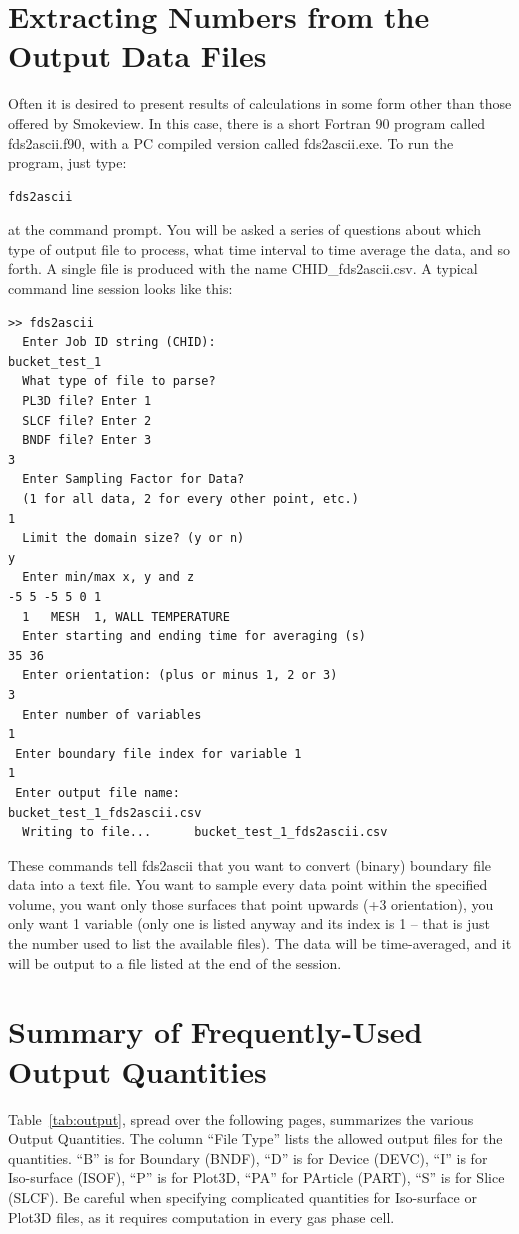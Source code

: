 \documentclass[11pt]{book}
\begin{document}
\section{Extracting Numbers from the Output Data Files}
\label{info:fds2ascii}

Often it is desired to present results of calculations in some form other than those offered by Smokeview. In this case, there is a short Fortran 90 program called {\ct fds2ascii.f90}, with a PC compiled version called {\ct fds2ascii.exe}. To run the program, just type:
\begin{lstlisting}
fds2ascii
\end{lstlisting}
at the command prompt. You will be asked a series of questions about which type of output file to process, what time interval to time average the data, and so forth. A single file is produced with the name {\ct CHID\_fds2ascii.csv}. A typical command line session looks like this:
\begin{lstlisting}
>> fds2ascii
  Enter Job ID string (CHID):
bucket_test_1
  What type of file to parse?
  PL3D file? Enter 1
  SLCF file? Enter 2
  BNDF file? Enter 3
3
  Enter Sampling Factor for Data?
  (1 for all data, 2 for every other point, etc.)
1
  Limit the domain size? (y or n)
y
  Enter min/max x, y and z
-5 5 -5 5 0 1
  1   MESH  1, WALL TEMPERATURE
  Enter starting and ending time for averaging (s)
35 36
  Enter orientation: (plus or minus 1, 2 or 3)
3
  Enter number of variables
1
 Enter boundary file index for variable 1
1
 Enter output file name:
bucket_test_1_fds2ascii.csv
  Writing to file...      bucket_test_1_fds2ascii.csv
\end{lstlisting}
These commands tell {\ct fds2ascii} that you want to convert (binary) boundary file data into a text file. You want to sample every data point within the specified volume, you want only those surfaces that point upwards (+3 orientation), you only want 1 variable (only one is listed anyway and its index is 1 -- that is just the number used to list the available files). The data will be time-averaged, and it will be output to a file listed at the end of the session.




\section{Summary of Frequently-Used Output Quantities}
\label{info:outputquantities}

Table~\ref{tab:output}, spread over the following pages, summarizes the various Output Quantities.
The column ``File Type'' lists the allowed output files for the quantities. ``B'' is for Boundary ({\ct BNDF}),
``D'' is for Device ({\ct DEVC}), ``I'' is for Iso-surface ({\ct ISOF}), ``P'' is for Plot3D, ``PA'' for PArticle ({\ct PART}),
``S'' is for Slice ({\ct SLCF}). Be careful
when specifying complicated quantities for Iso-surface or Plot3D files, as it requires computation in every gas phase cell.
\end{document}
